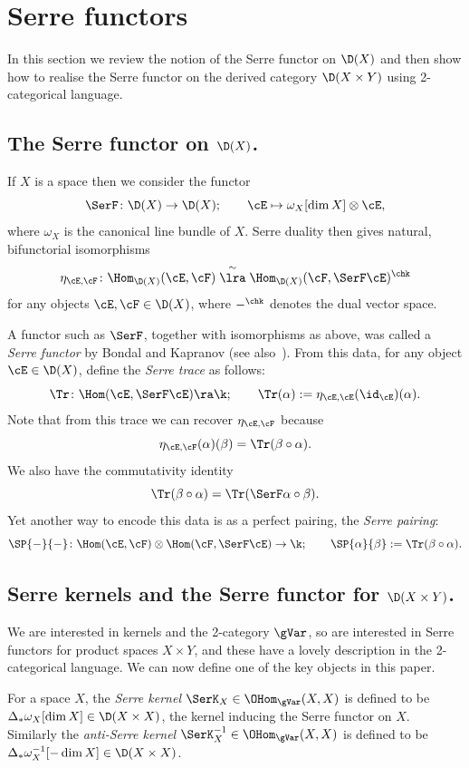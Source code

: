 \section{Serre functors}
\label{sec:serre}

In this section we review the notion of the Serre functor on $\D(X)$
and then show how to realise the Serre functor on the derived category
$\D(X\times Y)$ using 2-categorical language.

 \subsection{The Serre functor on $\D(X)$.}
\label{subsec:Serretrace}
If $X$ is a space then we consider the functor
\[\SerF\colon\D(X)\to \D(X);\qquad \cE\mapsto \omega_X[\dim
X]\otimes \cE,\] 
where $\omega_X$ is the canonical line bundle of $X$.  Serre duality
then gives natural, bifunctorial isomorphisms
\[ \eta_{\cE,\cF}\colon\Hom_{\D(X)}(\cE, \cF) \stackrel{\sim}{\lra}
\Hom_{\D(X)}(\cF, \SerF \cE)^\chk \]
for any objects $\cE,\cF\in \D(X)$, where ${-}^\chk$ denotes the dual
vector space.

A functor such as $\SerF$, together with isomorphisms as above, was
called a \emph{Serre functor} by Bondal and Kapranov
\cite{BonKapSerre} (see also~\cite{ReiVan}).  From this data, for any
object $\cE\in\D(X)$, define the \emph{Serre trace} as follows:
\[ \Tr\colon\Hom(\cE, \SerF \cE) \ra \k;\qquad \Tr(\alpha) := \eta_{\cE,\cE}(\id_\cE)(\alpha). \]
Note that from this trace we can recover $\eta_{\cE,\cF}$ because
\[ \eta_{\cE,\cF}(\alpha)(\beta)=\Tr(\beta\circ\alpha). \]
We also have the commutativity identity
\[ \Tr(\beta\circ \alpha) = \Tr(\SerF \alpha \circ \beta). \]
Yet another way to encode this data is as a perfect pairing, the
\emph{Serre pairing}:
\[\SP{{-}}{{-}}\colon \Hom(\cE,\cF)\otimes \Hom(\cF,\SerF \cE)\to
\k; \qquad \SP{\alpha}{\beta}:=\Tr(\beta\circ \alpha).\]

 \subsection{Serre kernels and the Serre functor for $\D(X\times
  Y)$.}
\label{subsec:serXY}
We are interested in kernels and the 2-category $\gVar$, so are
interested in Serre functors for product spaces $X\times Y$, and
these have a lovely description in the 2-categorical language.
We can now define one of the key objects in this paper.

\begin{Definition}
For a space $X$, the \emph{Serre kernel} $\SerK_X\in \OHom_\gVar(X,X)$
is defined to be $\Delta_*\omega_X[\dim X]\in\D(X\times X)$, the
kernel inducing the Serre functor on $X$.  Similarly the
\emph{anti-Serre kernel} $\SerK^{-1}_X\in \OHom_\gVar(X,X)$ is defined
to be $\Delta_*\omega^{-1}_X[-\dim X]\in\D(X\times X)$.
\end{Definition}

